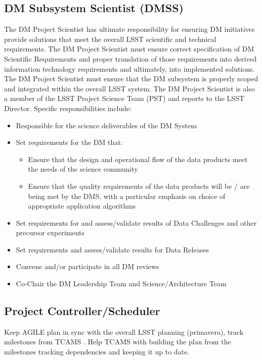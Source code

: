 \subsection{DM Subsystem Scientist (DMSS) \label{role:dmps} }
The DM Project Scientist has ultimate responsibility for ensuring DM initiatives provide solutions that meet the overall LSST scientific and technical requirements.  The DM Project Scientist must ensure correct specification of DM Scientific Requirements and proper translation of those requirements into derived information technology requirements and ultimately, into implemented solutions.  The DM Project Scientist must ensure that the DM subsystem is properly scoped and integrated within the overall LSST system.  The DM Project Scientist is also a member of the LSST Project Science Team (PST) and reports to the LSST Director. Specific responsibilities include:

\begin{itemize}
\item Responsible for the science deliverables of the DM System
\item Set requirements for the DM that:
\begin{itemize}
\item Ensure that the design and operational flow of the data products meet the needs of the science community
\item Ensure that the quality requirements of the data products will be / are being met by the DMS, with a particular emphasis on choice of appropriate application algorithms
\end{itemize}
\item Set requirements for and assess/validate results of Data Challenges and other precursor experiments
\item Set requirements and assess/validate results for Data Releases
\item Convene and/or participate in all DM reviews
\item Co-Chair the DM Leadership Team and Science/Architecture Team
\end{itemize}

\subsection{ Project Controller/Scheduler \label{role:pcon}}
Keep AGILE plan in sync with the overall LSST planning (primavera), track milestones from TCAMS . 
Help TCAMS with building the plan from the milestones tracking dependencies and keeping it up to date. 

